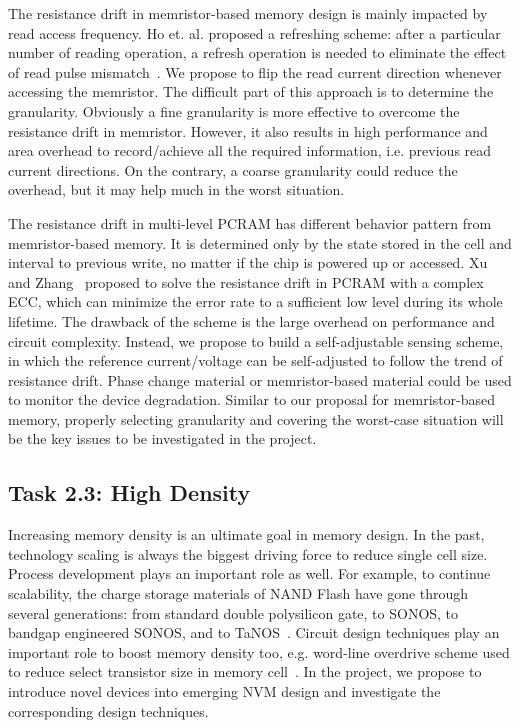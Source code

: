 The resistance drift in memristor-based memory design is mainly impacted by read access frequency. Ho et. al. proposed a refreshing scheme: after a particular number of reading operation, a refresh operation is needed to eliminate the effect of read pulse mismatch~\cite{Ho09}. We propose to flip the read current direction whenever accessing the memristor. The difficult part of this approach is to determine the granularity. Obviously a fine granularity is more effective to overcome the resistance drift in memristor. However, it also results in high performance and area overhead to record/achieve all the required information, i.e. previous read current directions. On the contrary, a coarse granularity could reduce the overhead, but it may help much in the worst situation.

The resistance drift in multi-level PCRAM has different behavior pattern from memristor-based memory. It is determined only by the state stored in the cell and interval to previous write, no matter if the chip is powered up or accessed. Xu and Zhang~\cite{Xu10} proposed to solve the resistance drift in PCRAM with a complex ECC, which can minimize the error rate to a sufficient low level during its whole lifetime. The drawback of the scheme is the large overhead on performance and circuit complexity. Instead, we propose to build a self-adjustable sensing scheme, in which the reference current/voltage can be self-adjusted to follow the trend of resistance drift. Phase change material or memristor-based material could be used to monitor the device degradation. Similar to our proposal for memristor-based memory, properly selecting granularity and covering the worst-case situation will be the key issues to be investigated in the project.

\subsection{Task 2.3: High Density}
Increasing memory density is an ultimate goal in memory design. In the past, technology scaling is always the biggest driving force to reduce single cell size. Process development plays an important role as well. For example, to continue scalability, the charge storage materials of NAND Flash have gone through several generations: from standard double polysilicon gate, to SONOS, to bandgap engineered SONOS, and to TaNOS~\cite{Lu09}. Circuit design techniques play an important role to boost memory density too, e.g. word-line overdrive scheme used to reduce select transistor size in memory cell~\cite{Li09}. In the project, we propose to introduce novel devices into emerging NVM design and investigate the corresponding design techniques.


